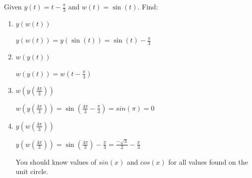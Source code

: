 \documentclass[nooutcomes, noinstructornotes]{ximera}
\begin{document}
\begin{instructorNotes}

\end{instructorNotes}



\begin{problem}
Given $y(t)=t- \frac{\pi}{3}$ and $w(t)=\sin(t)$.  Find:
\begin{enumerate}	
	\item  $y(w(t))$
		\begin{freeResponse}
			$y(w(t))=y\left( \sin(t) \right)=\sin(t)-\frac{\pi}{3}$
		\end{freeResponse}	


	\item  $w(y(t))$
		\begin{freeResponse}
		$w(y(t))=w\left( t-\frac{\pi}{3}\right)$
		\end{freeResponse}	


	\item  $w \left(y \left(\frac{4\pi}{3} \right)\right)$
		\begin{freeResponse}
		$w \left(y \left(\frac{4\pi}{3} \right)\right)=\sin \left(\frac{4\pi}{3}-\frac{\pi}{3}\right)=sin(\pi)=0$
		\end{freeResponse}	


	\item  $y(w(\frac{4\pi}{3}))$
		\begin{freeResponse}
		$y \left(w \left(\frac{4\pi}{3} \right)\right)=\sin \left(\frac{4\pi}{3}\right)-\frac{\pi}{3}=\frac{-\sqrt{3}}{2}-\frac{\pi}{3}$

		You should know values of $sin(x)$ and $cos(x)$ for all values found on the unit circle.
		\end{freeResponse}	
	
	\end{enumerate}
	
	
\end{problem}

\begin{instructorNotes}

\end{instructorNotes}
\end{document}
